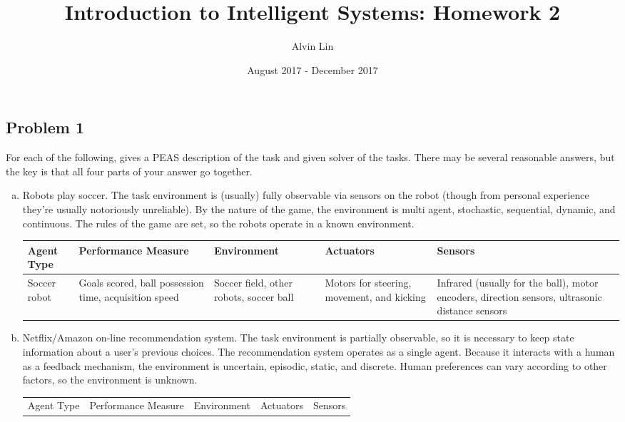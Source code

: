 \documentclass{math}
\title{Introduction to Intelligent Systems: Homework 2}
\author{Alvin Lin}
\date{August 2017 - December 2017}
\begin{document}
\maketitle

\subsection*{Problem 1}
For each of the following, gives a PEAS description of the task and given solver
of the tasks. There may be several reasonable answers, but the key is that all
four parts of your answer go together.
\begin{enumerate}[(a)]
  \item Robots play soccer. The task environment is (usually) fully observable
  via sensors on the robot (though from personal experience they're usually
  notoriously unreliable). By the nature of the game, the environment is multi
  agent, stochastic, sequential, dynamic, and continuous. The rules of the game
  are set, so the robots operate in a known environment.
  \begin{center}
    \begin{tabular}{|p{1cm}|p{4cm}|p{4cm}|p{3cm}|p{4cm}|}
      \hline
      Agent Type & Performance Measure & Environment & Actuators & Sensors \\
      \hline
      Soccer robot &
        Goals scored, ball possession time, acquisition speed &
        Soccer field, other robots, soccer ball &
        Motors for steering, movement, and kicking &
        Infrared (usually for the ball), motor encoders, direction sensors,
        ultrasonic distance sensors \\
      \hline
    \end{tabular}
  \end{center}
  \item Netflix/Amazon on-line recommendation system. The task environment is
  partially observable, so it is necessary to keep state information about a
  user's previous choices. The recommendation system operates as a single agent.
  Because it interacts with a human as a feedback mechanism, the environment is
  uncertain, episodic, static, and discrete. Human preferences can vary
  according to other factors, so the environment is unknown.
  \begin{center}
    \begin{tabular}{|p{3cm}|p{4cm}|p{3cm}|p{3cm}|p{3cm}|}
      \hline
      Agent Type & Performance Measure & Environment & Actuators & Sensors \\

\end{tabular}
\end{center}
\end{enumerate}
\end{document}
